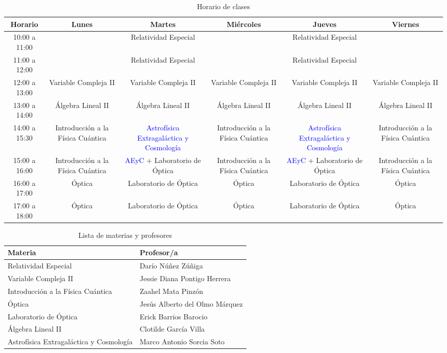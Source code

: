 \documentclass{article}
\begin{document}
\begin{table}[h!]
\centering
\begin{tabular}{|c|c|c|c|c|c|}
\hline
\textbf{Horario} & \textbf{Lunes} & \textbf{Martes} & \textbf{Miércoles} & \textbf{Jueves} & \textbf{Viernes} \\ \hline
10:00 a 11:00 &  & Relatividad Especial & & Relatividad Especial & \\ \hline
11:00 a 12:00 &  & Relatividad Especial & & Relatividad Especial & \\ \hline
12:00 a 13:00 & Variable Compleja II & Variable Compleja II & Variable Compleja II & Variable Compleja II & Variable Compleja II \\ \hline
13:00 a 14:00 & Álgebra Lineal II & Álgebra Lineal II & Álgebra Lineal II & Álgebra Lineal II & Álgebra Lineal II \\ \hline
14:00 a 15:30 & Introducción a la Física Cuántica & \textcolor{blue}{Astrofísica Extragaláctica y Cosmología} & Introducción a la Física Cuántica & \textcolor{blue}{Astrofísica Extragaláctica y Cosmología} & Introducción a la Física Cuántica \\ \hline
15:00 a 16:00 & Introducción a la Física Cuántica & \textcolor{blue}{AEyC} + Laboratorio de Óptica & Introducción a la Física Cuántica & \textcolor{blue}{AEyC} + Laboratorio de Óptica & Introducción a la Física Cuántica \\ \hline
16:00 a 17:00 & Óptica & Laboratorio de Óptica & Óptica & Laboratorio de Óptica & Óptica \\ \hline
17:00 a 18:00 & Óptica & Laboratorio de Óptica & Óptica & Laboratorio de Óptica & Óptica \\ \hline
\end{tabular}
\caption{Horario de clases}
\end{table}

\begin{table}[h!]
\centering
\begin{tabular}{|l|l|}
\hline
\textbf{Materia} & \textbf{Profesor/a} \\ \hline
Relatividad Especial & Darío Núñez Zúñiga \\ \hline
Variable Compleja II & Jessie Diana Pontigo Herrera \\ \hline
Introducción a la Física Cuántica & Zaahel Mata Pinzón \\ \hline
Óptica & Jesús Alberto del Olmo Márquez \\ \hline
Laboratorio de Óptica & Erick Barrios Barocio \\ \hline
Álgebra Lineal II & Clotilde García Villa \\ \hline
Astrofísica Extragaláctica y Cosmología & Marco Antonio Sorcia Soto \\ \hline
\end{tabular}
\caption{Lista de materias y profesores}
\end{table}
\end{document}
